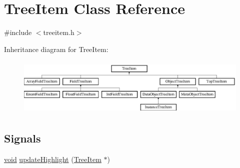 \hypertarget{class_tree_item}{\section{\-Tree\-Item \-Class \-Reference}
\label{class_tree_item}
}


{\ttfamily \#include $<$treeitem.\-h$>$}

\-Inheritance diagram for \-Tree\-Item\-:\begin{figure}[H]
\begin{center}
\leavevmode
\includegraphics[height=2.807018cm]{class_tree_item}
\end{center}
\end{figure}
\subsection*{\-Signals}
\begin{DoxyCompactItemize}
\item 
\hyperlink{group___u_a_v_objects_plugin_ga444cf2ff3f0ecbe028adce838d373f5c}{void} \hyperlink{group___u_a_v_object_browser_plugin_gab8702d2046500fbe3dd7cee66ebcda70}{update\-Highlight} (\hyperlink{class_tree_item}{\-Tree\-Item} $\ast$)
\end{DoxyCompactItemize}
